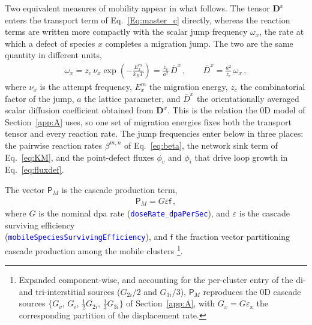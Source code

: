 \documentclass{article}
\newcommand{\textttclr}[1]{\textcolor{blue}{\texttt{#1}}}
\newcommand{\spvec}[1]{\bm{\mathsf{#1}}}   %
\begin{document}
Two equivalent measures of mobility appear in what follows. The tensor $\bm D^x$ enters the transport term of Eq.~\eqref{Eq:master_c} directly, whereas the reaction terms are written more compactly with the scalar jump frequency $\omega_x$, the rate at which a defect of species $x$ completes a migration jump. The two are the same quantity in different units,
\begin{align}\label{eq:omegaD}
\omega_x=z_c\,\nu_x\exp\!\left(-\frac{E^m_x}{k_BT}\right)=\frac{z_c}{a^2}\,\overline{D}^{x}\, ,
\qquad
\overline{D}^{x}=\frac{a^2}{z_c}\,\omega_x\, ,
\end{align}
where $\nu_x$ is the attempt frequency, $E^m_x$ the migration energy, $z_c$ the combinatorial factor of the jump, $a$ the lattice parameter, and $\overline{D}^{x}$ the orientationally averaged scalar diffusion coefficient obtained from $\bm D^x$. This is the relation the $0$D model of Section~\ref{app:A} uses, so one set of migration energies fixes both the transport tensor and every reaction rate. The jump frequencies enter below in three places: the pairwise reaction rates $\beta^{m,n}$ of Eq.~\eqref{eq:beta}, the network sink term of Eq.~\eqref{eq:KM}, and the point-defect fluxes $\phi_v$ and $\phi_i$ that drive loop growth in Eq.~\eqref{eq:fluxdef}.

The vector $\spvec{P}_M$ is the cascade production term,
\begin{align}\label{Eq:PGM}
   \spvec{P}_{M} =    G \varepsilon \spvec{f}\,,
\end{align}
where $G$ is the nominal dpa rate (\textttclr{doseRate\_dpaPerSec}), and $\varepsilon$ is the cascade surviving efficiency\\ (\textttclr{mobileSpeciesSurvivingEfficiency}), and $\spvec{f}$ the fraction vector partitioning cascade production among the mobile clusters \footnote{Expanded component-wise, and accounting for the per-cluster entry of the di- and tri-interstitial sources ($G_{2i}/2$ and $G_{3i}/3$), $\spvec{P}_M$ reproduces the $0$D cascade sources $\{G_v,\,G_i,\,\tfrac12 G_{2i},\,\tfrac13 G_{3i}\}$ of Section~\ref{app:A}, with $G_x=G\varepsilon_x$ the corresponding partition of the displacement rate.}.
\end{document}

